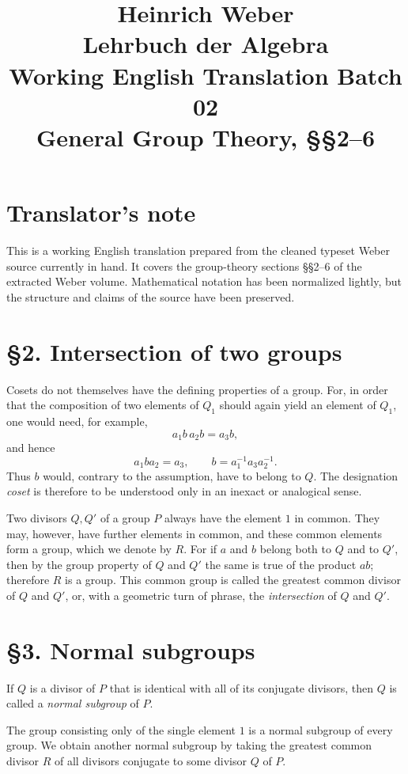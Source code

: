 \documentclass[11pt]{article}
\title{Heinrich Weber\\Lehrbuch der Algebra\\Working English Translation Batch 02\\General Group Theory, §§2--6}
\author{}
\date{}
\begin{document}
\maketitle

\section*{Translator's note}
This is a working English translation prepared from the cleaned typeset Weber source currently in hand. It covers the group-theory sections §§2--6 of the extracted Weber volume. Mathematical notation has been normalized lightly, but the structure and claims of the source have been preserved.

\section*{§2. Intersection of two groups}
Cosets do not themselves have the defining properties of a group. For, in order that the composition of two elements of $Q_1$ should again yield an element of $Q_1$, one would need, for example,
\[
 a_1 b\, a_2 b = a_3 b,
\]
and hence
\[
 a_1 b a_2 = a_3,
 \qquad
 b = a_1^{-1} a_3 a_2^{-1}.
\]
Thus $b$ would, contrary to the assumption, have to belong to $Q$. The designation \emph{coset} is therefore to be understood only in an inexact or analogical sense.

Two divisors $Q,Q'$ of a group $P$ always have the element $1$ in common. They may, however, have further elements in common, and these common elements form a group, which we denote by $R$. For if $a$ and $b$ belong both to $Q$ and to $Q'$, then by the group property of $Q$ and $Q'$ the same is true of the product $ab$; therefore $R$ is a group. This common group is called the greatest common divisor of $Q$ and $Q'$, or, with a geometric turn of phrase, the \emph{intersection} of $Q$ and $Q'$.

\section*{§3. Normal subgroups}
If $Q$ is a divisor of $P$ that is identical with all of its conjugate divisors, then $Q$ is called a \emph{normal subgroup} of $P$.

The group consisting only of the single element $1$ is a normal subgroup of every group. We obtain another normal subgroup by taking the greatest common divisor $R$ of all divisors conjugate to some divisor $Q$ of $P$.
\end{document}
